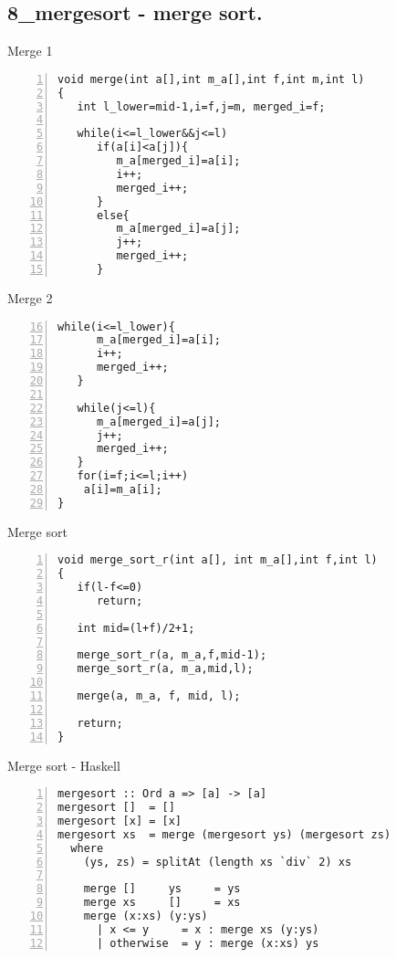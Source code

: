 \documentclass{beamer}
\begin{document}
\subsection*{8\_mergesort - merge sort.}
\begin{frame}[fragile]{Merge 1}
\begin{lstlisting}[numbers=left]
void merge(int a[],int m_a[],int f,int m,int l)
{
   int l_lower=mid-1,i=f,j=m, merged_i=f;

   while(i<=l_lower&&j<=l)
      if(a[i]<a[j]){
         m_a[merged_i]=a[i];
         i++;
         merged_i++;
      }
      else{
         m_a[merged_i]=a[j];
         j++;
         merged_i++;
      }
\end{lstlisting}
\end{frame}
\begin{frame}[fragile]{Merge 2}
\begin{lstlisting}[numbers=left,firstnumber=16]
   while(i<=l_lower){
      m_a[merged_i]=a[i];
      i++;
      merged_i++;
   }

   while(j<=l){
      m_a[merged_i]=a[j];
      j++;
      merged_i++;
   }
   for(i=f;i<=l;i++)
    a[i]=m_a[i];
}
\end{lstlisting}
\end{frame}

\begin{frame}[fragile]{Merge sort}
\begin{lstlisting}[numbers=left]
void merge_sort_r(int a[], int m_a[],int f,int l)
{
   if(l-f<=0)
      return;

   int mid=(l+f)/2+1;

   merge_sort_r(a, m_a,f,mid-1);
   merge_sort_r(a, m_a,mid,l);

   merge(a, m_a, f, mid, l);

   return;
}
\end{lstlisting}
\end{frame}

\begin{frame}[fragile]{Merge sort - Haskell}
\begin{lstlisting}[numbers=left]
mergesort :: Ord a => [a] -> [a]
mergesort []  = []
mergesort [x] = [x]
mergesort xs  = merge (mergesort ys) (mergesort zs)
  where
    (ys, zs) = splitAt (length xs `div` 2) xs

    merge []     ys     = ys
    merge xs     []     = xs
    merge (x:xs) (y:ys)
      | x <= y     = x : merge xs (y:ys)
      | otherwise  = y : merge (x:xs) ys
\end{lstlisting}
\end{frame}
\end{document}
